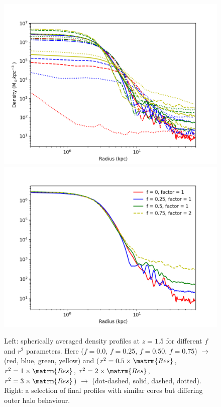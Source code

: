 \documentclass[a4paper,11pt]{article}
\begin{document}
\begin{figure}[!htb]
\centering
{}
  \includegraphics[trim={1cm 0 2cm 0.2cm},scale=0.55]{profiles_combined.png}
\endminipage\hfill
{}%
  \includegraphics[trim={1cm 0 2cm 0},scale=0.55]{profiles_selected.png}
\endminipage
\caption{Left: spherically averaged density profiles at $z=1.5$ for different $f$ and $r^2$ parameters. Here ($f = 0.0$, $f=0.25$, $f=0.50$, $f=0.75$) $\rightarrow$ (red, blue, green, yellow) and ($r^2=0.5\times\matrm{Res}$, $r^2=1\times\matrm{Res}$, $r^2=2\times\matrm{Res}$, $r^2=3\times\matrm{Res}$) $\rightarrow$ (dot-dashed, solid, dashed, dotted). Right: a selection of final profiles with similar cores but differing outer halo behaviour.}\label{fig:profiles_combined}
\end{figure}
\end{document}

